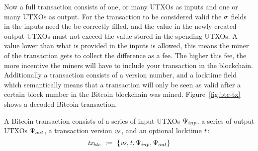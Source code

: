 \begin{center}
    \fbox{
    \begin{varwidth}{\textwidth}
        \procedure[linenumbering]{$\procCreateUTXO{\varValue}{\varScriptPubKey}$} {
        \pcreturn \varUTXO \opAssign \{ \varValue \opAssign \varValue, \varScriptPubKey \opAssign \varScriptPubKey,
        \varScriptSig \opAssign \cnstEmptySet \}
        } \\
        \procedure[linenumbering]{$\procSpendUTXO{\varUTXO}{\varScriptSig}$} {
        \{ \varValue, \varScriptPubKey \} \opFunResult \varUTXO \\
        \pcreturn \varUTXO \opAssign \{ \varValue \opAssign \varValue, \varScriptPubKey \opAssign \varScriptPubKey,
        \varScriptSig \opAssign \varScriptSig \}
        } \\
        \procedure[linenumbering]{$\procVerfUTXO{\varUTXO}$} {
        \{ \varValue, \varScriptPubKey, \varScriptSig \} \opFunResult \varUTXO \\
        \pcreturn \procVerf{\varScriptPubKey}{\varScriptSig}{\varValue}
        }
    \end{varwidth}
    }
\end{center}

Now a full transaction consists of one, or many UTXOs as inputs and one or many UTXOs as output.
For the transaction to be considered valid the $\mathit{\sigma}$ fields in the inputs need the be correctly filled, and the value in the newly created output UTXOs must not exceed the value stored in the spending UTXOs.
A value lower than what is provided in the inputs is allowed, this means the miner of the transaction gets to collect the difference as a fee.
The higher this fee, the more incentive the miners will have to include your transaction in the blockchain.
Additionally a transaction consists of a version number, and a locktime field which semantically means that a
transaction will only be seen as valid after a certain block number in the Bitcoin blockchain was mined.
Figure~\ref{fig:btc-tx} shows a decoded Bitcoin transaction.

\begin{definition}
    A Bitcoin transaction consists of a series of input UTXOs $\Psi_{inp}$, a series of output UTXOs $\Psi_{out}$, a
    transaction version $\mathit{vs}$, and an optional locktime $\mathit{t}$:
    \[ \mathit{tx_{btc}} ~:=~ \{ \mathit{vs}, \mathit{t}, \Psi_{inp}, \Psi_{out} \} \]
\end{definition}

